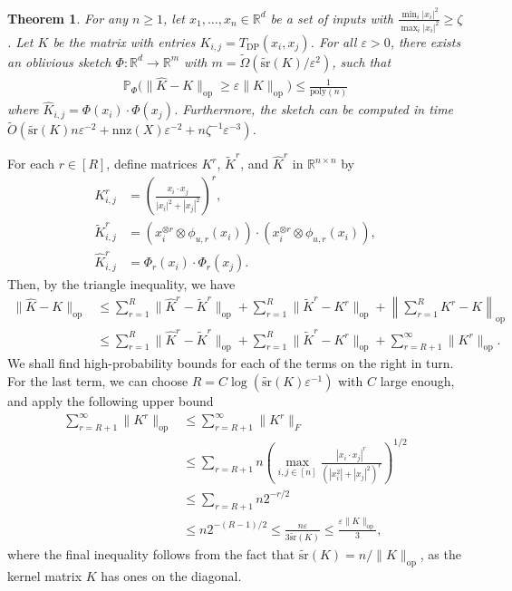 \documentclass{article}
\theoremstyle{plain}
\newtheorem*{theorem*}{Theorem}
\theoremstyle{definition}
\theoremstyle{remark}
\newcommand{\numeq}[1]{\begin{align}#1\end{align}}
\newcommand{\eq}[1]{\begin{align*}#1\end{align*}}
\newcommand{\R}{\mathbb{R}}
\renewcommand{\Pr}{\mathbb{P}}
\begin{document}
\begin{theorem*} 
For any $n\ge 1$, let $x_1,\dots,x_n\in\R^d$ be a set of inputs with $\frac{\min_i |x_i|^2}{\max_i |x_i|^2} \geq \zeta$. Let $K$ be the matrix with entries $K_{i,j} = T_\text{DP}(x_i,x_j)$. For all $\varepsilon>0$, there exists an oblivious sketch $\Phi:\R^d \to \R^m$ with $m=\tilde\Omega(\tilde{\text{sr}}(K) /\varepsilon^{2})$, such that 
\eq{
\Pr_{\Phi}\Big(\|\widehat K-K\|_\text{op} \ge\varepsilon \|K\|_\text{op}) \leq \frac{1}{\text{poly}(n)}
}
where $\widehat K_{i,j} = \Phi(x_i)\cdot \Phi(x_j)$. Furthermore, the sketch can be computed in time $\tilde O(\tilde{\text{sr}}(K)n\varepsilon^{-2}+\text{nnz}(X)\varepsilon^{-2}+n\zeta^{-1}\varepsilon^{-3})$.
\end{theorem*}

For each $r\in[R]$, define matrices $K^r$, $\tilde K^r$, and $\widehat K^r$ in $\R^{n\times n}$ by
\eq{
K^r_{i,j} &= \left(\frac{x_i\cdot x_j}{|x_i|^2+|x_j|^2}\right)^r, \\
\tilde K^r_{i,j} & = (x_i^{\otimes r} \otimes \phi_{u,r}(x_i))\cdot (x_i^{\otimes r} \otimes \phi_{u,r}(x_i)), \\
\widehat K^r_{i,j} &= \Phi_r(x_i)\cdot \Phi_r(x_j).
} 
Then, by the triangle inequality, we have
\numeq{
\|\widehat K - K\|_\text{op} 
&\leq \sum_{r=1}^R \|\widehat K^r - \tilde K^r \|_\text{op} + \sum_{r=1}^R \| \tilde K^r-K^r \|_\text{op}+ \left\|\sum_{r=1}^R K^r - K\right\|_\text{op} \nonumber \\
&\leq \sum_{r=1}^R \|\widehat K^r - \tilde K^r \|_\text{op} + \sum_{r=1}^R \| \tilde K^r-K^r \|_\text{op}+ \sum_{r=R+1}^\infty \|K^r \|_\text{op}. \label{terms}
}
We shall find high-probability bounds for each of the terms on the right in turn. For the last term, we can choose $R=C \log(\tilde{\text{sr}}(K) \varepsilon^{-1})$ with $C$ large enough, and apply the following upper bound
\numeq{ 
\sum_{r=R+1}^\infty \|K^r \|_\text{op} 
&\leq \sum_{r=R+1}^\infty \|K^r \|_F \nonumber \\
&\leq \sum_{r=R+1} n \left(\max_{i,j\in[n]} \frac{|x_i\cdot x_j|^r}{(|x_i^2|+|x_j|^2)^r}\right)^{1/2} \nonumber \\
&\leq \sum_{r=R+1} n2^{-r/2} \nonumber \\
&\leq n2^{-(R-1)/2}  \leq \frac{n\varepsilon }{3\tilde{\text{sr}}(K)} \leq  \frac{\varepsilon \|K\|_\text{op}}{3}, \label{third term}
}
where the final inequality follows from the fact that $\tilde{\text{sr}}(K) = n/\|K\|_\text{op}$, as the kernel matrix $K$ has ones on the diagonal. 
\end{document}
